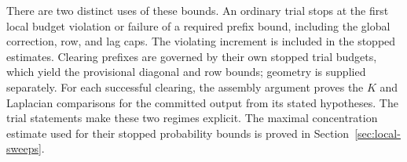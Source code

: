 There are two distinct uses of these bounds. An ordinary trial stops at
the first local budget violation or failure of a required prefix bound,
including the global correction, row, and lag caps. The violating increment
is included in the stopped estimates.
Clearing prefixes are governed by their own stopped trial budgets, which
yield the provisional diagonal and row bounds; geometry is supplied
separately. For each
successful clearing, the assembly argument proves the $K$ and Laplacian
comparisons for the committed output from its stated hypotheses. The
trial statements make these two regimes explicit. The maximal
concentration estimate used for their stopped probability bounds is
proved in Section~\ref{sec:local-sweeps}.
